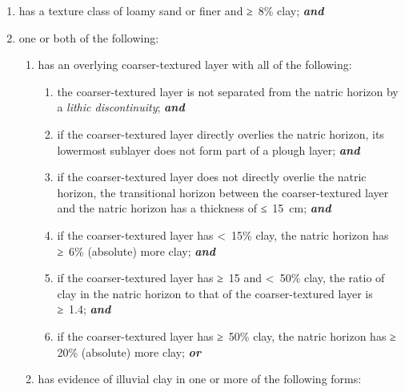 \documentclass[
  letterpaper,
  DIV=11,
  numbers=noendperiod]{scrreprt}
\providecommand{\tightlist}{%
  \setlength{\itemsep}{0pt}\setlength{\parskip}{0pt}}\usepackage{longtable,booktabs,array}
\begin{document}
\begin{enumerate}
\def\labelenumi{\arabic{enumi}.}
\item
  has a texture class of loamy sand or finer and ≥~8\% clay;
  \textbf{\emph{and}}
\item
  one or both of the following:

  \begin{enumerate}
  \def\labelenumii{\alph{enumii}.}
  \tightlist
  \item
    has an overlying coarser-textured layer with all of the following:

    \begin{enumerate}
    \def\labelenumiii{\roman{enumiii}.}
    \item
      the coarser-textured layer is not separated from the natric
      horizon by a \emph{lithic discontinuity}; \textbf{\emph{and}}
    \item
      if the coarser-textured layer directly overlies the natric
      horizon, its lowermost sublayer does not form part of a plough
      layer; \textbf{\emph{and}}
    \item
      if the coarser-textured layer does not directly overlie the natric
      horizon, the transitional horizon between the coarser-textured
      layer and the natric horizon has a thickness of ≤~15~cm;
      \textbf{\emph{and}}
    \item
      if the coarser-textured layer has \textless~15\% clay, the natric
      horizon has ≥~6\% (absolute) more clay; \textbf{\emph{and}}
    \item
      if the coarser-textured layer has ≥~15 and \textless~50\% clay,
      the ratio of clay in the natric horizon to that of the
      coarser-textured layer is ≥~1.4; \textbf{\emph{and}}
    \item
      if the coarser-textured layer has ≥~50\% clay, the natric horizon
      has ≥~ 20\% (absolute) more clay; \textbf{\emph{or}}
    \end{enumerate}
  \item
    has evidence of illuvial clay in one or more of the following forms:


\end{enumerate}
\end{enumerate}
\end{document}
